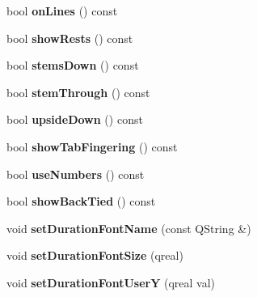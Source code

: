 \begin{DoxyCompactItemize}
\item 
\mbox{\label{class_ms_1_1_staff_type_af45a9aadd8ee7ec2943a1ecc4ab9d0e3}} 
bool {\bfseries on\+Lines} () const
\item 
\mbox{\label{class_ms_1_1_staff_type_a2892778f2e2ea5887ee4d18a6adadf5a}} 
bool {\bfseries show\+Rests} () const
\item 
\mbox{\label{class_ms_1_1_staff_type_a8e1bad2308ff2498a7a22a8bb1674241}} 
bool {\bfseries stems\+Down} () const
\item 
\mbox{\label{class_ms_1_1_staff_type_ab58bb2c64cfe98ac2da35e4d1fde492e}} 
bool {\bfseries stem\+Through} () const
\item 
\mbox{\label{class_ms_1_1_staff_type_ae8af065df32cc1cdd015953f081ae2f9}} 
bool {\bfseries upside\+Down} () const
\item 
\mbox{\label{class_ms_1_1_staff_type_a4269402c267c30c5089fc321a8641f93}} 
bool {\bfseries show\+Tab\+Fingering} () const
\item 
\mbox{\label{class_ms_1_1_staff_type_a03363f75dd31140cf88d0e7e007483df}} 
bool {\bfseries use\+Numbers} () const
\item 
\mbox{\label{class_ms_1_1_staff_type_a6e5ada5484049db0e0e36f665ee3c171}} 
bool {\bfseries show\+Back\+Tied} () const
\item 
\mbox{\label{class_ms_1_1_staff_type_adf2c3442635375e168420997ad7b5178}} 
void {\bfseries set\+Duration\+Font\+Name} (const Q\+String \&)
\item 
\mbox{\label{class_ms_1_1_staff_type_a6000ba02cdba21a67be62273dd94091f}} 
void {\bfseries set\+Duration\+Font\+Size} (qreal)
\item 
\mbox{\label{class_ms_1_1_staff_type_af50472dc5685e86a4b7389a3b6bb5b9f}} 
void {\bfseries set\+Duration\+Font\+UserY} (qreal val)

\end{DoxyCompactItemize}
